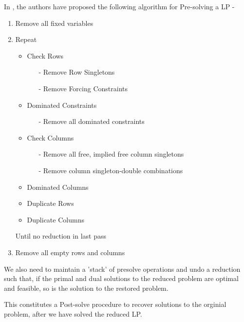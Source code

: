 \documentclass[twoside]{article}
\begin{document}
\begin{multicols}{2}
In \cite{ipm:Andersen9}, the authors have proposed the following algorithm for Pre-solving a LP - 

\begin{enumerate}
\item Remove all fixed variables
\item Repeat
\begin{itemize}
    \item Check Rows
         \begin{itemize}
         \item[-] Remove Row Singletons
         \item[-] Remove Forcing Constraints
         \end{itemize}
         
    \item Dominated Constraints
         \begin{itemize}
         \item[-]  Remove all dominated constraints
         \end{itemize}
         
    \item Check Columns
         \begin{itemize}
         \item[-] Remove all free, implied free column singletons
         \item[-] Remove column singleton-double combinations
         \end{itemize}
         
    \item Dominated Columns
    
    \item Duplicate Rows
    
    \item Duplicate Columns
   
\end{itemize}
   Until no reduction in last pass
\item Remove all empty rows and columns
\end{enumerate}

We also need to maintain a 'stack' of presolve operations and undo a reduction such that, if the primal and dual solutions to the reduced problem are optimal and feasible, so is the solution to the restored problem. 

This constitutes a Post-solve procedure to recover solutions to the orginial problem, after we have solved the reduced LP. 


\end{multicols}
\end{document}
